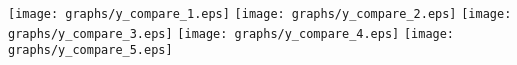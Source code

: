\documentclass{article}
\begin{document}
\texttt{[image: graphs/y\_compare\_1.eps]} \pagebreak
\texttt{[image: graphs/y\_compare\_2.eps]} \pagebreak
\texttt{[image: graphs/y\_compare\_3.eps]} \pagebreak
\texttt{[image: graphs/y\_compare\_4.eps]} \pagebreak
\texttt{[image: graphs/y\_compare\_5.eps]} \pagebreak
\end{document}
